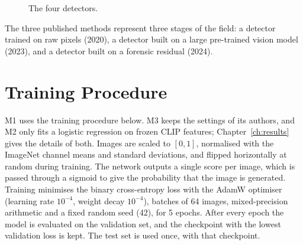 \documentclass{mnnit}
\begin{document}
\begin{figure}[htbp]
\centering
{}
\caption{The four detectors.}
\label{fig:flow-detectors}
\end{figure}

The three published methods represent three stages of the field: a
detector trained on raw pixels (2020), a detector built on a large
pre-trained vision model (2023), and a detector built on a forensic
residual (2024).

\section{Training Procedure}
M1 uses the training procedure below. M3 keeps the settings of its
authors, and M2 only fits a logistic regression on frozen CLIP features;
Chapter~\ref{ch:results} gives the details of both. Images are scaled
to $[0,1]$, normalised with the ImageNet channel means and standard
deviations, and flipped horizontally at random during training. The
network outputs a single score per image, which is passed through a
sigmoid to give the probability that the image is generated. Training
minimises the binary cross-entropy loss with the AdamW optimiser
(learning rate $10^{-4}$, weight decay $10^{-4}$), batches of 64 images,
mixed-precision arithmetic and a fixed random seed (42), for 5 epochs.
After every epoch the model is evaluated on the validation set, and the
checkpoint with the lowest validation loss is kept. The test set is used
once, with that checkpoint.
\end{document}
